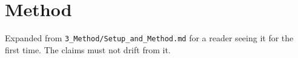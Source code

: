 \section{Method}
\label{sec:method}

Expanded from \texttt{3\_Method/Setup\_and\_Method.md} for a reader seeing it for the first
time. The claims must not drift from it.

